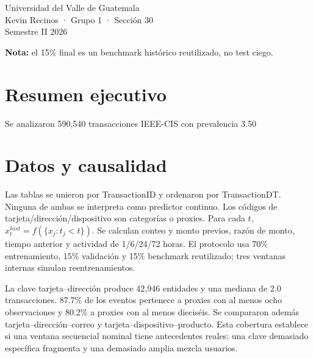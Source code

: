 \documentclass[10pt]{article}
\begin{document}
\begin{titlepage}\pagecolor{navy}\color{white}\raggedright\vspace*{1cm}{\Large DEEP LEARNING Y SISTEMAS INTELIGENTES\par}\vspace{1cm}{\Huge\bfseries Proyecto 1\\[.25cm]Monitoreo transaccional\par}\vspace{.7cm}{\LARGE Variables causales, boosting y validación temporal\par}\vfill{\Large Universidad del Valle de Guatemala\\Kevin Recinos · Grupo 1 · Sección 30\\Semestre II 2026\par}\vspace{1cm}{\Large Wilson Alejandro Calderón Argueta · 22018\\Pablo Daniel Barillas Moreno · 22193\par}\vfill\textbf{Nota:} el 15\% final es un benchmark histórico reutilizado, no test ciego.\end{titlepage}\nopagecolor
\section*{Resumen ejecutivo} Se analizaron 590,540 transacciones IEEE-CIS con prevalencia 3.50%
\section{Datos y causalidad} Las tablas se unieron por TransactionID y ordenaron por TransactionDT. Ninguna de ambas se interpreta como predictor continuo. Los códigos de tarjeta/dirección/dispositivo son categorías o proxies. Para cada $t$, $x_t^{hist}=f(\{x_j:t_j<t\})$. Se calculan conteo y monto previos, razón de monto, tiempo anterior y actividad de 1/6/24/72 horas. El protocolo usa 70\% entrenamiento, 15\% validación y 15\% benchmark reutilizado; tres ventanas internas simulan reentrenamientos.

La clave tarjeta--dirección produce 42,946 entidades y una mediana de 2.0 transacciones. 87.7\% de los eventos pertenece a proxies con al menos ocho observaciones y 80.2\% a proxies con al menos dieciséis. Se compararon además tarjeta--dirección--correo y tarjeta--dispositivo--producto. Esta cobertura establece si una ventana secuencial nominal tiene antecedentes reales; una clave demasiado específica fragmenta y una demasiado amplia mezcla usuarios.
\end{document}
